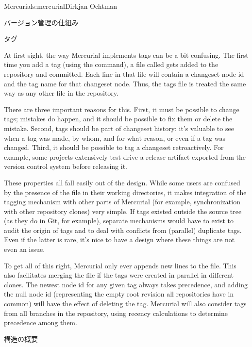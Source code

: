 \begin{aosachapter}{Mercurial}{s:mercurial}{Dirkjan Ochtman}
\begin{aosasect1}{バージョン管理の仕組み}
\begin{aosasect2}{タグ}

At first sight, the way Mercurial implements tags can be a bit
confusing. The first time you add a tag (using the 
command), a file called  gets added to the repository and
committed. Each line in that file will contain a changeset node id and
the tag name for that changeset node. Thus, the tags file is treated
the same way as any other file in the repository.

There are three important reasons for this. First, it must be possible
to change tags; mistakes do happen, and it should be possible to fix
them or delete the mistake. Second, tags should be part of changeset
history: it's valuable to see when a tag was made, by whom, and for
what reason, or even if a tag was changed. Third, it should be
possible to tag a changeset retroactively. For example, some projects
extensively test drive a release artifact exported from the version
control system before releasing it.

These properties all fall easily out of the  design. While some
users are confused by the presence of the  file in their
working directories, it makes integration of the tagging mechanism
with other parts of Mercurial (for example, synchronization with other
repository clones) very simple. If tags existed outside the source
tree (as they do in Git, for example), separate mechanisms would have
to exist to audit the origin of tags and to deal with conflicts from
(parallel) duplicate tags. Even if the latter is rare, it's nice to
have a design where these things are not even an issue.

To get all of this right, Mercurial only ever appends new lines to the
 file. This also facilitates merging the file if the
tags were created in parallel in different clones. The newest node id
for any given tag always takes precedence, and adding the null node id
(representing the empty root revision all repositories have in common)
will have the effect of deleting the tag. Mercurial will also consider
tags from all branches in the repository, using recency calculations
to determine precedence among them.

\end{aosasect2}

\end{aosasect1}

\begin{aosasect1}{構造の概要}


\end{aosasect1}
\end{aosachapter}
